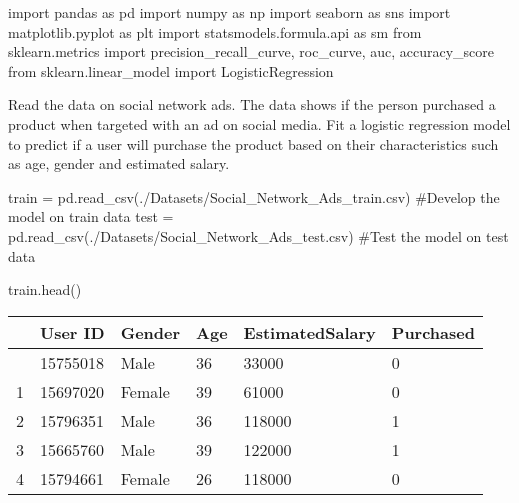 \documentclass[
  letterpaper,
  DIV=11,
  numbers=noendperiod]{scrreprt}
\newenvironment{Shaded}{\begin{snugshade}}{\end{snugshade}}
\newcommand{\CommentTok}[1]{\textcolor[rgb]{0.37,0.37,0.37}{#1}}
\newcommand{\ImportTok}[1]{\textcolor[rgb]{0.00,0.46,0.62}{#1}}
\newcommand{\NormalTok}[1]{\textcolor[rgb]{0.00,0.23,0.31}{#1}}
\newcommand{\OperatorTok}[1]{\textcolor[rgb]{0.37,0.37,0.37}{#1}}
\newcommand{\StringTok}[1]{\textcolor[rgb]{0.13,0.47,0.30}{#1}}
\begin{document}
\begin{Shaded}
\begin{Highlighting}[]
\ImportTok{import}\NormalTok{ pandas }\ImportTok{as}\NormalTok{ pd}
\ImportTok{import}\NormalTok{ numpy }\ImportTok{as}\NormalTok{ np}
\ImportTok{import}\NormalTok{ seaborn }\ImportTok{as}\NormalTok{ sns}
\ImportTok{import}\NormalTok{ matplotlib.pyplot }\ImportTok{as}\NormalTok{ plt}
\ImportTok{import}\NormalTok{ statsmodels.formula.api }\ImportTok{as}\NormalTok{ sm}
\ImportTok{from}\NormalTok{ sklearn.metrics }\ImportTok{import}\NormalTok{ precision\_recall\_curve, roc\_curve, auc, accuracy\_score}
\ImportTok{from}\NormalTok{ sklearn.linear\_model }\ImportTok{import}\NormalTok{ LogisticRegression}
\end{Highlighting}
\end{Shaded}

Read the data on social network ads. The data shows if the person
purchased a product when targeted with an ad on social media. Fit a
logistic regression model to predict if a user will purchase the product
based on their characteristics such as age, gender and estimated salary.

\begin{Shaded}
\begin{Highlighting}[]
\NormalTok{train }\OperatorTok{=}\NormalTok{ pd.read\_csv(}\StringTok{\textquotesingle{}./Datasets/Social\_Network\_Ads\_train.csv\textquotesingle{}}\NormalTok{) }\CommentTok{\#Develop the model on train data}
\NormalTok{test }\OperatorTok{=}\NormalTok{ pd.read\_csv(}\StringTok{\textquotesingle{}./Datasets/Social\_Network\_Ads\_test.csv\textquotesingle{}}\NormalTok{) }\CommentTok{\#Test the model on test data}
\end{Highlighting}
\end{Shaded}

\begin{Shaded}
\begin{Highlighting}[]
\NormalTok{train.head()}
\end{Highlighting}
\end{Shaded}

\begin{longtable}[]{@{}llllll@{}}
\toprule\noalign{}
& User ID & Gender & Age & EstimatedSalary & Purchased \\
\midrule\noalign{}
\endhead
\bottomrule\noalign{}
\endlastfoot
0 & 15755018 & Male & 36 & 33000 & 0 \\
1 & 15697020 & Female & 39 & 61000 & 0 \\
2 & 15796351 & Male & 36 & 118000 & 1 \\
3 & 15665760 & Male & 39 & 122000 & 1 \\
4 & 15794661 & Female & 26 & 118000 & 0 \\
\end{longtable}
\end{document}
